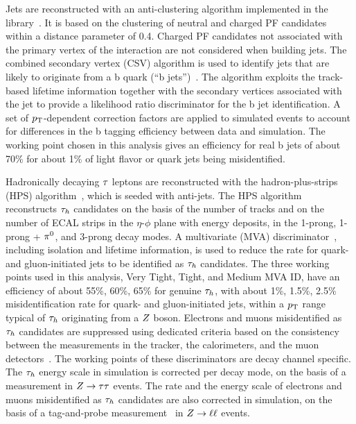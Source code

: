 Jets are reconstructed with an anti-\kt clustering algorithm implemented
in the \FASTJET library~\cite{Cacciari:2011ma, Cacciari:fastjet2}.
It is based on the clustering of neutral and charged PF candidates within 
a distance parameter of 0.4. Charged PF candidates not associated with 
the primary vertex of the interaction are not considered when building jets. 
The combined secondary vertex (CSV) algorithm is used to identify jets 
that are likely to originate from a b quark 
(``b jets'')~\cite{1748-0221-8-04-P04013}. The algorithm 
exploits the track-based lifetime information together with the secondary 
vertices associated with the jet to provide a likelihood ratio discriminator 
for the b jet identification. A set of $p_\mathrm{T}$-dependent correction
factors are applied to simulated events to account for differences in the 
b tagging efficiency between data and simulation. The working point chosen 
in this analysis gives an efficiency for real b jets of about 70\% for 
about 1\% of light flavor or quark jets being misidentified.

Hadronically decaying $\tau$ leptons are reconstructed with the hadron-plus-strips (HPS)
algorithm~\cite{Khachatryan:2015dfa, CMS-PAS-TAU-16-002}, which is
seeded with anti-\kt jets. The HPS algorithm reconstructs $\tau_{h}$ 
candidates on the basis of the number of tracks and on the number of ECAL 
strips in the $\eta$-$\phi$ plane with energy deposits, in the 1-prong,
1-prong + $\pi^{0}$, and 3-prong decay modes. A
multivariate (MVA) discriminator~\cite{Hocker:2007ht}, including isolation
and lifetime information, is used to reduce the rate for  quark- and gluon-initiated jets
to be identified as $\tau_{h}$ candidates. The three working points used in this analysis,
Very Tight, Tight, and Medium MVA ID,
have an efficiency of about 55\%, 60\%, 65\% for genuine $\tau_{h}$,
with about 1\%, 1.5\%, 2.5\% misidentification rate for quark- and gluon-initiated jets, 
within a $p_\mathrm{T}$ range typical of $\tau_{h}$ originating from a $Z$ boson.
Electrons and muons misidentified as $\tau_{h}$ candidates are suppressed using 
dedicated criteria based on the consistency between the measurements in the 
tracker, the calorimeters, and the muon detectors~\cite{Khachatryan:2015dfa, CMS-PAS-TAU-16-002}.
The working points of these discriminators are
decay channel specific. The $\tau_{h}$ energy scale in simulation is corrected 
per decay mode, on the basis of a measurement in $Z\to\tau\tau$ events. 
The rate and the energy scale of electrons and muons misidentified as $\tau_{h}$ 
candidates are also corrected in simulation, on the basis of a tag-and-probe 
measurement~\cite{CMS:2011aa} in $Z\to\ell\ell$ events.

